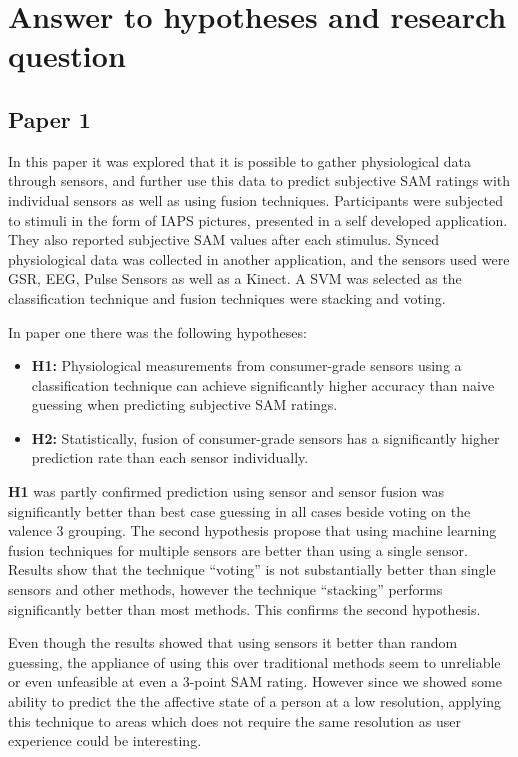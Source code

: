 \chapter{Answer to hypotheses and research question}
\section{Paper 1}
In this paper it was explored that it is possible to gather physiological data through sensors, and further use this data to predict subjective SAM ratings with individual sensors as well as using fusion techniques. 
Participants were subjected to stimuli in the form of IAPS pictures, presented in a self developed application. 
They also reported subjective SAM values after each stimulus. 
Synced physiological data was collected in another application, and the sensors used were GSR, EEG, Pulse Sensors as well as a Kinect.
A SVM was selected as the classification technique and fusion techniques were stacking and voting.

In paper one there was the following hypotheses:
\begin{itemize}
    \item \textbf{H1:} Physiological measurements from consumer-grade sensors using a classification technique can achieve significantly higher accuracy than naive guessing when predicting subjective SAM ratings.
    \item \textbf{H2:} Statistically, fusion of consumer-grade sensors has a significantly
higher prediction rate than each sensor individually.
\end{itemize}

\textbf{H1} was partly confirmed prediction using sensor and sensor fusion was significantly better than best case guessing in all cases beside voting on the valence 3 grouping. 
The second hypothesis propose that using machine learning fusion techniques for multiple sensors are better than using a single sensor. 
Results show that the technique ``voting'' is not substantially better than single sensors and other methods, however the technique ``stacking'' performs significantly better than most methods. This confirms the second hypothesis.

Even though the results showed that using sensors it better than random guessing, the appliance of using this over traditional methods seem to unreliable or even unfeasible at even a 3-point SAM rating.
However since we showed some ability to predict the the affective state of a person at a low resolution, applying this technique to areas which does not require the same resolution as user experience could be interesting.

